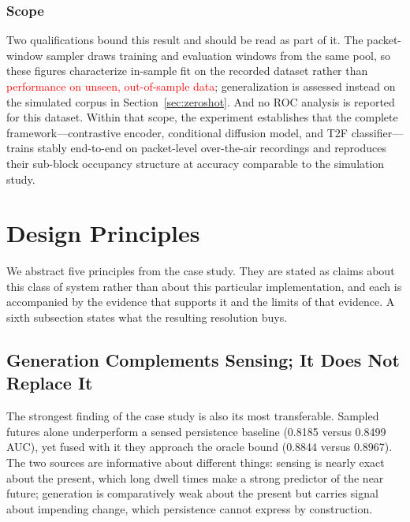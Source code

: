 \documentclass[lettersize,journal]{IEEEtran}
\newcommand{\red}[1]{\textcolor{red}{#1}}
\begin{document}
\subsubsection{\textbf{Scope}}
Two qualifications bound this result and should be read as part of it. The
packet-window sampler draws training and evaluation windows from the same pool,
so these figures characterize in-sample fit on the recorded dataset rather than \red{performance on unseen, out-of-sample data}; generalization is assessed instead on the simulated
corpus in Section~\ref{sec:zeroshot}. And no ROC analysis is reported for this
dataset. Within that scope, the experiment establishes that the complete
framework---contrastive encoder, conditional diffusion model, and T2F
classifier---trains stably end-to-end on packet-level over-the-air recordings
and reproduces their sub-block occupancy structure at accuracy comparable to the
simulation study.

\section{\textbf{Design Principles}}

We abstract five principles from the case study. They are stated as
claims about this class of system rather than about this particular
implementation, and each is accompanied by the evidence that supports it
and the limits of that evidence. A sixth subsection states what the
resulting resolution buys.

\subsection{\textbf{Generation Complements Sensing; It Does Not Replace It}}
The strongest finding of the case study is also its most transferable.
Sampled futures alone underperform a sensed persistence baseline
(0.8185 versus 0.8499 AUC), yet fused with it they approach the oracle
bound (0.8844 versus 0.8967). The two sources are informative about
different things: sensing is nearly exact about the present, which
long dwell times make a strong predictor of the near future; generation
is comparatively weak about the present but carries signal about
impending change, which persistence cannot express by construction.
\end{document}
